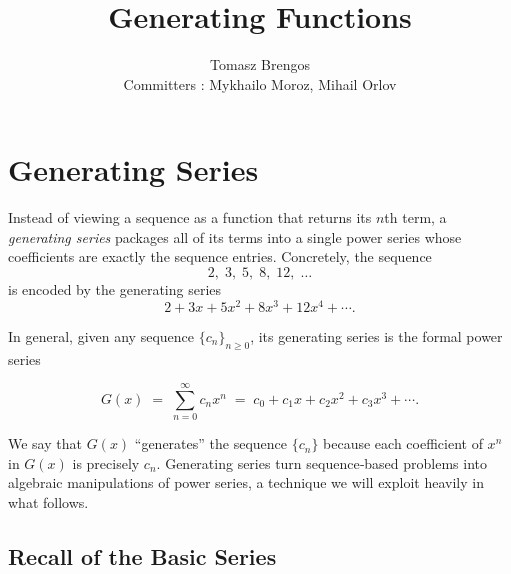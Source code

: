 \documentclass{article}
\title{Generating Functions}
\author{Tomasz Brengos \\  
Committers : Mykhailo Moroz, Mihail Orlov}
\date{}
\begin{document}
\maketitle
\section{Generating Series}

Instead of viewing a sequence as a function that returns its \(n\)th term, a \emph{generating series} packages all of its terms into a single power series whose coefficients are exactly the sequence entries.  Concretely, the sequence
\[
2,\;3,\;5,\;8,\;12,\;\dots
\]
is encoded by the generating series
\[
2 + 3x + 5x^2 + 8x^3 + 12x^4 + \cdots.
\]

In general, given any sequence \(\{c_n\}_{n\ge0}\), its generating series is the formal power series

\[
G(x) \;=\; \sum_{n=0}^\infty c_n x^n 
\;=\;
c_0 + c_1 x + c_2 x^2 + c_3 x^3 + \cdots.
\]

We say that \(G(x)\) “generates” the sequence \(\{c_n\}\) because each coefficient of \(x^n\) in \(G(x)\) is precisely \(c_n\).  Generating series turn sequence‑based problems into algebraic manipulations of power series, a technique we will exploit heavily in what follows.

\subsection*{Recall of the Basic Series}
\end{document}
